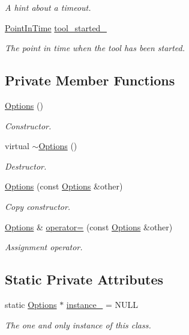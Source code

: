\begin{DoxyCompactItemize}
\begin{DoxyCompactList}\small\item\em A hint about a timeout. \end{DoxyCompactList}\item 
\hyperlink{Options_8h_af3a9f634f27bed7e98dbc23e5c6f807d}{Point\-In\-Time} \hyperlink{classOptions_a64ba8ff8e25368f44764cfe68fcb7610}{tool\-\_\-started\-\_\-}
\begin{DoxyCompactList}\small\item\em The point in time when the tool has been started. \end{DoxyCompactList}\end{DoxyCompactItemize}
\subsection*{Private Member Functions}
\begin{DoxyCompactItemize}
\item 
\hyperlink{classOptions_ab72fb640172a6109e34c8a5366563753}{Options} ()
\begin{DoxyCompactList}\small\item\em Constructor. \end{DoxyCompactList}\item 
virtual \hyperlink{classOptions_a86ddb85b183f8b58af5481f30a42fa92}{$\sim$\-Options} ()
\begin{DoxyCompactList}\small\item\em Destructor. \end{DoxyCompactList}\item 
\hyperlink{classOptions_a746ca91be29587927e0249be6e75817a}{Options} (const \hyperlink{classOptions}{Options} \&other)
\begin{DoxyCompactList}\small\item\em Copy constructor. \end{DoxyCompactList}\item 
\hyperlink{classOptions}{Options} \& \hyperlink{classOptions_aa668cd73b61005074c44ea99f0b9b831}{operator=} (const \hyperlink{classOptions}{Options} \&other)
\begin{DoxyCompactList}\small\item\em Assignment operator. \end{DoxyCompactList}\end{DoxyCompactItemize}
\subsection*{Static Private Attributes}
\begin{DoxyCompactItemize}
\item 
static \hyperlink{classOptions}{Options} $\ast$ \hyperlink{classOptions_a9097fb97d94616d9166bc7e8df97a58a}{instance\-\_\-} = N\-U\-L\-L
\begin{DoxyCompactList}\small\item\em The one and only instance of this class. \end{DoxyCompactList}\end{DoxyCompactItemize}



